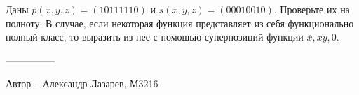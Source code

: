 \question
Даны $p(x, y, z) = (10111110)$ и $s(x, y, z) = (00010010)$. Проверьте их на полноту. В случае, если некоторая функция представляет из себя функционально полный класс, то выразить из нее с помощью суперпозиций функции $\overline{x}, xy, 0$.

---------------

Автор -- Александр Лазарев, М3216
